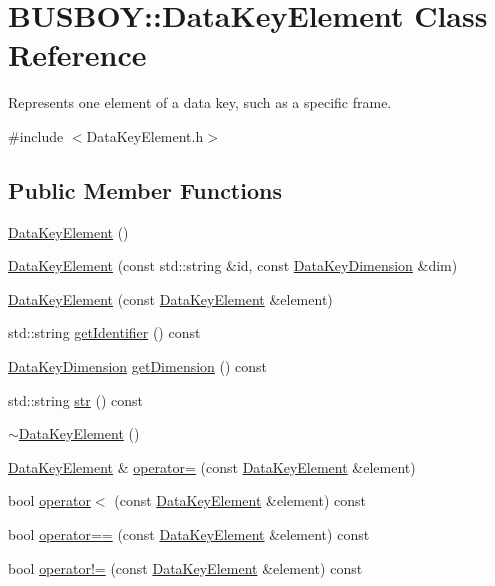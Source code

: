 \hypertarget{classBUSBOY_1_1DataKeyElement}{
\section{BUSBOY::DataKeyElement Class Reference}
\label{classBUSBOY_1_1DataKeyElement}
}


Represents one element of a data key, such as a specific frame.  


{\ttfamily \#include $<$DataKeyElement.h$>$}\subsection*{Public Member Functions}
\begin{DoxyCompactItemize}
\item 
\hyperlink{classBUSBOY_1_1DataKeyElement_a07b9a18632a9f33d2c263c3af3319070}{DataKeyElement} ()
\item 
\hyperlink{classBUSBOY_1_1DataKeyElement_a977005ecb31cb4f751fc77b80b64e17a}{DataKeyElement} (const std::string \&id, const \hyperlink{classBUSBOY_1_1DataKeyDimension}{DataKeyDimension} \&dim)
\item 
\hyperlink{classBUSBOY_1_1DataKeyElement_a344e097aa9c537d86c2b000cb23bcffa}{DataKeyElement} (const \hyperlink{classBUSBOY_1_1DataKeyElement}{DataKeyElement} \&element)
\item 
std::string \hyperlink{classBUSBOY_1_1DataKeyElement_afd0c6e49ab20d504ee8ee280abe51364}{getIdentifier} () const 
\item 
\hyperlink{classBUSBOY_1_1DataKeyDimension}{DataKeyDimension} \hyperlink{classBUSBOY_1_1DataKeyElement_a381d5ddc6610072f1cf9464d88b838ee}{getDimension} () const 
\item 
std::string \hyperlink{classBUSBOY_1_1DataKeyElement_a31f455462157d55473217d99a42bfdc5}{str} () const 
\item 
\hyperlink{classBUSBOY_1_1DataKeyElement_af290e8a4dc942b2b490802cd4f712a46}{$\sim$DataKeyElement} ()
\item 
\hyperlink{classBUSBOY_1_1DataKeyElement}{DataKeyElement} \& \hyperlink{classBUSBOY_1_1DataKeyElement_af409262d775de97c84082eb03ce7fd3e}{operator=} (const \hyperlink{classBUSBOY_1_1DataKeyElement}{DataKeyElement} \&element)
\item 
bool \hyperlink{classBUSBOY_1_1DataKeyElement_a8c83f858dbda1cb7f3fe0cc5c5008719}{operator$<$} (const \hyperlink{classBUSBOY_1_1DataKeyElement}{DataKeyElement} \&element) const 
\item 
bool \hyperlink{classBUSBOY_1_1DataKeyElement_ab08e95251e5abcf1eb179f162b8431a1}{operator==} (const \hyperlink{classBUSBOY_1_1DataKeyElement}{DataKeyElement} \&element) const 
\item 
bool \hyperlink{classBUSBOY_1_1DataKeyElement_a00d80857330b83c58d6e0476fb3e646e}{operator!=} (const \hyperlink{classBUSBOY_1_1DataKeyElement}{DataKeyElement} \&element) const 
\end{DoxyCompactItemize}
